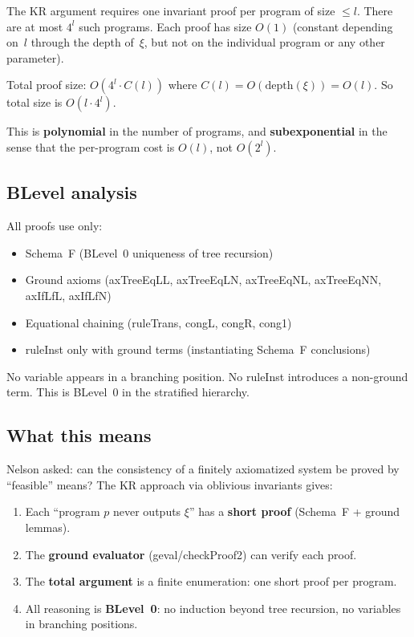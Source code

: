 \documentclass[11pt]{article}
\begin{document}
The KR argument requires one invariant proof per program of size $\leq l$.
There are at most $4^l$ such programs. Each proof has size $O(1)$ (constant
depending on~$l$ through the depth of~$\xi$, but not on the individual program
or any other parameter).

Total proof size: $O(4^l \cdot C(l))$ where $C(l) = O(\mathrm{depth}(\xi)) = O(l)$.
So total size is $O(l \cdot 4^l)$.

This is \textbf{polynomial} in the number of programs, and \textbf{subexponential}
in the sense that the per-program cost is $O(l)$, not $O(2^l)$.

\subsection{BLevel analysis}

All proofs use only:
\begin{itemize}
\item Schema~F (BLevel~0 uniqueness of tree recursion)
\item Ground axioms (axTreeEqLL, axTreeEqLN, axTreeEqNL, axTreeEqNN, axIfLfL, axIfLfN)
\item Equational chaining (ruleTrans, congL, congR, cong1)
\item ruleInst only with ground terms (instantiating Schema~F conclusions)
\end{itemize}

No variable appears in a branching position.
No ruleInst introduces a non-ground term.
This is BLevel~0 in the stratified hierarchy.

\subsection{What this means}

Nelson asked: can the consistency of a finitely axiomatized system be proved
by ``feasible'' means? The KR approach via oblivious invariants gives:
\begin{enumerate}
\item Each ``program $p$ never outputs $\xi$'' has a \textbf{short proof} (Schema~F + ground lemmas).
\item The \textbf{ground evaluator} (geval/checkProof2) can verify each proof.
\item The \textbf{total argument} is a finite enumeration: one short proof per program.
\item All reasoning is \textbf{BLevel~0}: no induction beyond tree recursion, no variables in branching positions.
\end{enumerate}
\end{document}
